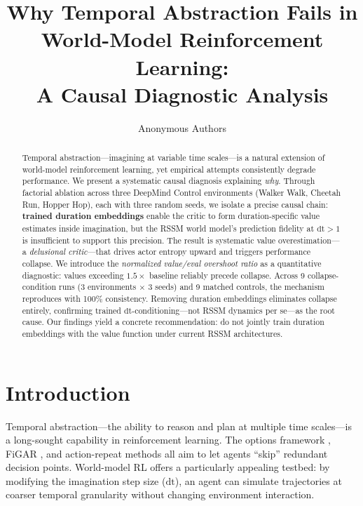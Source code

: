 \documentclass[10pt,letterpaper]{article}
\title{Why Temporal Abstraction Fails in World-Model Reinforcement Learning:\\A Causal Diagnostic Analysis}
\author{
  Anonymous Authors
}
\date{}
\begin{document}
\maketitle

\begin{abstract}
Temporal abstraction---imagining at variable time scales---is a natural extension of world-model reinforcement learning, yet empirical attempts consistently degrade performance. We present a systematic causal diagnosis explaining \emph{why}. Through factorial ablation across three DeepMind Control environments (Walker Walk, Cheetah Run, Hopper Hop), each with three random seeds, we isolate a precise causal chain: \textbf{trained duration embeddings} enable the critic to form duration-specific value estimates inside imagination, but the RSSM world model's prediction fidelity at $\mathrm{dt}{>}1$ is insufficient to support this precision. The result is systematic value overestimation---a \emph{delusional critic}---that drives actor entropy upward and triggers performance collapse. We introduce the \emph{normalized value/eval overshoot ratio} as a quantitative diagnostic: values exceeding $1.5\times$ baseline reliably precede collapse. Across 9 collapse-condition runs (3 environments $\times$ 3 seeds) and 9 matched controls, the mechanism reproduces with 100\% consistency. Removing duration embeddings eliminates collapse entirely, confirming trained $\mathrm{dt}$-conditioning---not RSSM dynamics per se---as the root cause. Our findings yield a concrete recommendation: do not jointly train duration embeddings with the value function under current RSSM architectures.
\end{abstract}

\section{Introduction}
\label{sec:intro}

Temporal abstraction---the ability to reason and plan at multiple time scales---is a long-sought capability in reinforcement learning. The options framework \citep{sutton1999options}, FiGAR \citep{sharma2017figar}, and action-repeat methods all aim to let agents ``skip'' redundant decision points. World-model RL offers a particularly appealing testbed: by modifying the imagination step size ($\mathrm{dt}$), an agent can simulate trajectories at coarser temporal granularity without changing environment interaction.
\end{document}
